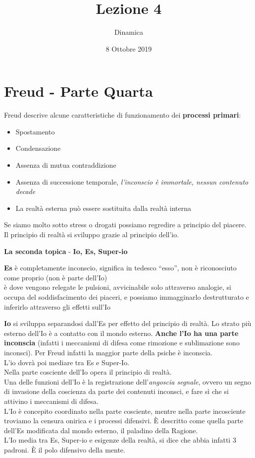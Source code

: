 \documentclass[
]{article}
\date{8 Ottobre 2019}
\title{Lezione 4}
\author{Dinamica}
\providecommand{\tightlist}{%
  \setlength{\itemsep}{0pt}\setlength{\parskip}{0pt}}
\begin{document}
\maketitle
\section{Freud - Parte Quarta}
Freud descrive alcune caratteristiche di funzionamento dei
\textbf{processi primari}:

\begin{itemize}
\tightlist
\item
  Spostamento
\item
  Condensazione
\item
  Assenza di mutua contraddizione
\item
  Assenza di successione temporale, \emph{l'inconscio è immortale,
  nessun contenuto decade}
\item
  La realtà esterna può essere sostituita dalla realtà interna
\end{itemize}

Se siamo molto sotto stress o drogati possiamo regredire a principio del
piacere.\\
Il principio di realtà si sviluppo grazie al principio dell'io.

\textbf{La seconda topica} - \textbf{Io, Es, Super-io}

\textbf{Es} è completamente inconscio, significa in tedesco ``esso'',
non è riconosciuto come proprio (non è parte dell'Io)\\
è dove vengono relegate le pulsioni, avvicinabile solo attraverso
analogie, si occupa del soddisfacimento dei piaceri, e possiamo
immagginarlo destrutturato e inferirlo attraverso gli effetti sull'Io

\textbf{Io} si sviluppa separandosi dall'Es per effetto del principio di
realtà. Lo strato più esterno dell'Io è a contatto con il mondo esterno.
\textbf{Anche l'Io ha una parte inconscia} (infatti i meccanismi di
difesa come rimozione e sublimazione sono inconsci). Per Freud infatti
la maggior parte della psiche è inconscia.\\
L'io dovrà poi mediare tra Es e Super-Io.\\
Nella parte cosciente dell'Io opera il principio di realtà.\\
Una delle funzioni dell'Io è la registrazione dell'\emph{angoscia
segnale}, ovvero un segno di invasione della coscienza da parte dei
contenuti inconsci, e fare sì che si attivino i meccanismi di difesa.\\
L'Io è concepito coordinato nella parte cosciente, mentre nella parte
incosciente troviamo la censura onirica e i processi difensivi. È
descritto come quella parte dell'Es modificata dal mondo esterno, il
paladino della Ragione.\\
L'Io media tra Es, Super-io e esigenze della realtà, si dice che abbia
infatti 3 padroni. È il polo difensivo della mente.
\end{document}
